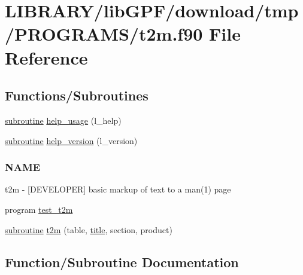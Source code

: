 \hypertarget{t2m_8f90}{}\section{L\+I\+B\+R\+A\+R\+Y/lib\+G\+P\+F/download/tmp/\+P\+R\+O\+G\+R\+A\+M\+S/t2m.f90 File Reference}
\label{t2m_8f90}
\subsection*{Functions/\+Subroutines}
\begin{DoxyCompactItemize}
\item 
\hyperlink{M__stopwatch_83_8txt_acfbcff50169d691ff02d4a123ed70482}{subroutine} \hyperlink{t2m_8f90_a3e09a3b52ee8fb04eeb93fe5761626a8}{help\+\_\+usage} (l\+\_\+help)
\item 
\hyperlink{M__stopwatch_83_8txt_acfbcff50169d691ff02d4a123ed70482}{subroutine} \hyperlink{t2m_8f90_a39c21619b08a3c22f19e2306efd7f766}{help\+\_\+version} (l\+\_\+version)
\begin{DoxyCompactList}\small\item\em \subsubsection*{N\+A\+ME}

t2m -\/ \mbox{[}D\+E\+V\+E\+L\+O\+P\+ER\mbox{]} basic markup of text to a man(1) page \end{DoxyCompactList}\item 
program \hyperlink{t2m_8f90_a1d0ef3619e5da531507fb99db2ebb4fe}{test\+\_\+t2m}
\item 
\hyperlink{M__stopwatch_83_8txt_acfbcff50169d691ff02d4a123ed70482}{subroutine} \hyperlink{t2m_8f90_ab191ed2a41113781c7994c9642cfbbab}{t2m} (table, \hyperlink{print__watch_83_8txt_a15b5bd21156bb9fca6a755ab8c029a9c}{title}, section, product)
\end{DoxyCompactItemize}


\subsection{Function/\+Subroutine Documentation}
\mbox{\label{t2m_8f90_a3e09a3b52ee8fb04eeb93fe5761626a8}} 
